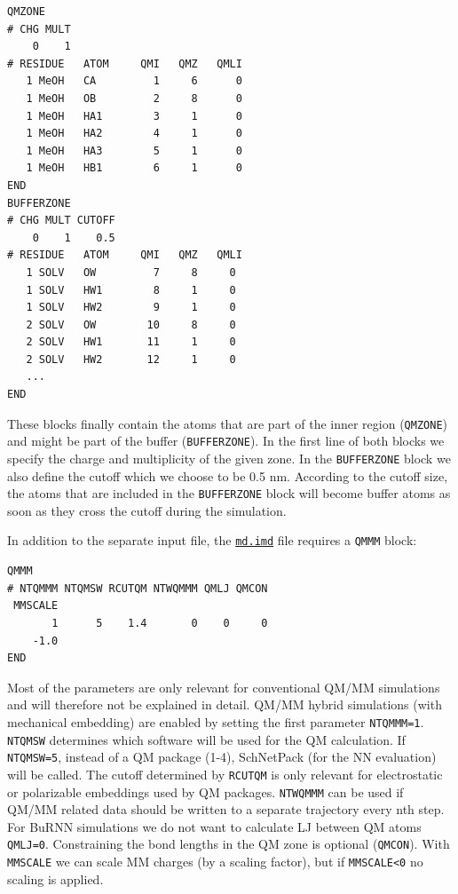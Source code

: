 \begin{lstlisting}[breaklines=true, breakatwhitespace=false]
QMZONE
# CHG MULT
    0    1
# RESIDUE   ATOM     QMI   QMZ   QMLI
   1 MeOH   CA         1     6      0
   1 MeOH   OB         2     8      0
   1 MeOH   HA1        3     1      0
   1 MeOH   HA2        4     1      0
   1 MeOH   HA3        5     1      0
   1 MeOH   HB1        6     1      0
END
BUFFERZONE
# CHG MULT CUTOFF 
    0    1    0.5
# RESIDUE   ATOM     QMI   QMZ   QMLI
   1 SOLV   OW         7     8     0
   1 SOLV   HW1        8     1     0
   1 SOLV   HW2        9     1     0
   2 SOLV   OW        10     8     0
   2 SOLV   HW1       11     1     0
   2 SOLV   HW2       12     1     0
   ...
END
\end{lstlisting}

These blocks finally contain the atoms that are part of the inner region (\texttt{QMZONE}) and might be part of the buffer (\texttt{BUFFERZONE}). In the first line of both blocks we specify the charge and multiplicity of the given zone. In the \texttt{BUFFERZONE} block we also define the cutoff which we choose to be 0.5 nm. According to the cutoff size, the atoms that are included in the \texttt{BUFFERZONE} block will become buffer atoms as soon as they cross the cutoff during the simulation.

In addition to the separate input file, the \href{https://github.com/LierB/gromos_tutorial_livecoms/blob/burnn_tutorial_rc/tutorial_files/t_06/md_burnn/md.imd}{\texttt{md.imd}} file requires a \texttt{QMMM} block:
\begin{lstlisting}[breaklines=true, breakatwhitespace=false]
QMMM
# NTQMMM NTQMSW RCUTQM NTWQMMM QMLJ QMCON      
 MMSCALE
       1      5    1.4       0    0     0
    -1.0
END
\end{lstlisting}

Most of the parameters are only relevant for conventional QM/MM simulations and will therefore not be explained in detail.
QM/MM hybrid simulations (with mechanical embedding) are enabled by setting the first parameter \texttt{NTQMMM=1}. \texttt{NTQMSW} determines which software will be used for the QM calculation. If \texttt{NTQMSW=5}, instead of a QM package (1-4), SchNetPack (for the NN evaluation) will be called. The cutoff determined by \texttt{RCUTQM} is only relevant for electrostatic or polarizable embeddings used by QM packages. \texttt{NTWQMMM} can be used if QM/MM related data should be written to a separate trajectory every nth step. For BuRNN simulations we do not want to calculate LJ between QM atoms \texttt{QMLJ=0}. Constraining the bond lengths in the QM zone is optional (\texttt{QMCON}). With \texttt{MMSCALE} we can scale MM charges (by a scaling factor), but if \texttt{MMSCALE<0} no scaling is applied.

